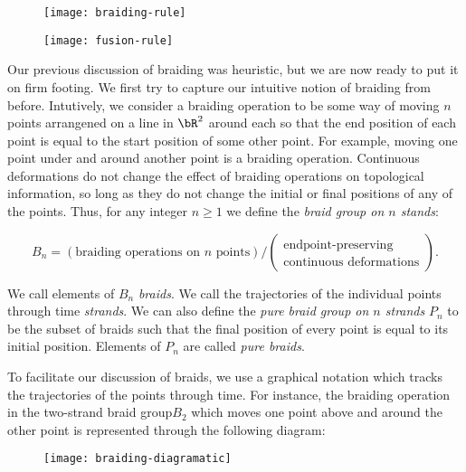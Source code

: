 \begin{figure}
\begin{center}
\texttt{[image: braiding-rule]}
\label{braiding-rule}
\end{center}
\end{figure}

\begin{figure}
\begin{center}
\texttt{[image: fusion-rule]}
\label{fusion-rule}
\end{center}
\end{figure}

Our previous discussion of braiding was heuristic, but we are now ready to put it on firm footing. We first try to capture our intuitive notion of braiding from before. Intutively, we consider a braiding operation to be some way of moving $n$ points arrangened on a line in $\bR^2$ around each so that the end position of each point is equal to the start position of some other point. For example, moving one point under and around another point is a braiding operation. Continuous deformations do not change the effect of braiding operations on topological information, so long as they do not change the initial or final positions of any of the points. Thus, for any integer $n\geq 1$ we define the \textit{braid group on $n$ stands}:

$$B_n=(\text{braiding operations on $n$ points})/(\substack{\text{endpoint-preserving} \\ \text{continuous deformations}}).$$

We call elements of $B_n$ {\em braids}. We call the trajectories of the individual points through time \textit{strands}. We can also define the {\em pure braid group on $n$ strands} $P_n$ to be the subset of braids such that the final position of every point is equal to its initial position. Elements of $P_n$ are called {\em pure braids}.

To facilitate our discussion of braids, we use a graphical notation which tracks the trajectories of the points through time. For instance, the braiding operation in the two-strand braid group$B_2$ which moves one point above and around the other point is represented through the following diagram:

\begin{figure}[h]
\begin{center}
\texttt{[image: braiding-diagramatic]}
\label{braiding-diagramatic}
\end{center}
\end{figure}


